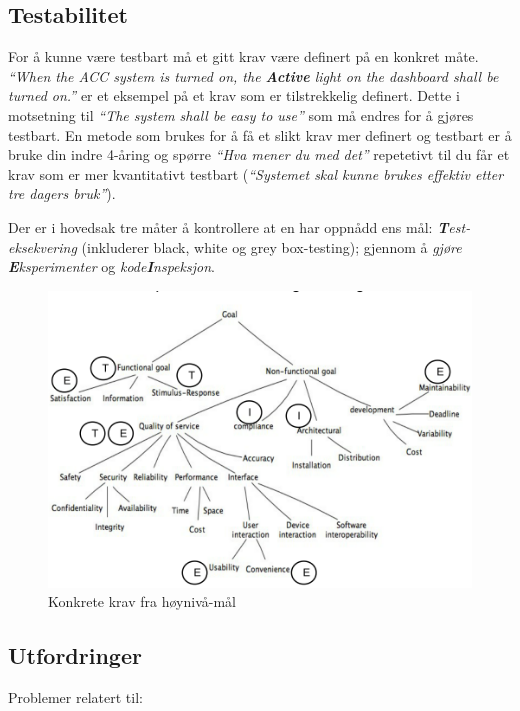 \subsection{Testabilitet}

For å kunne være testbart må et gitt krav være definert på en konkret
måte. \emph{``When the ACC system is turned on, the \textbf{Active}
light on the dashboard shall be turned on.''} er et eksempel på et krav
som er tilstrekkelig definert. Dette i motsetning til \emph{``The system
shall be easy to use''} som må endres for å gjøres testbart. En metode
som brukes for å få et slikt krav mer definert og testbart er å bruke
din indre 4-åring og spørre \emph{``Hva mener du med det''} repetetivt
til du får et krav som er mer kvantitativt testbart (\emph{``Systemet
skal kunne brukes effektiv etter tre dagers bruk''}).

Der er i hovedsak tre måter å kontrollere at en har oppnådd ens mål:
\emph{\textbf{T}est-eksekvering} (inkluderer black, white og grey
box-testing); gjennom å \emph{gjøre \textbf{E}ksperimenter} og
\emph{kode\textbf{I}nspeksjon}.

\begin{figure}[htbp]
\centering
\includegraphics{Forelesning 03/img/1.png}
\caption{Konkrete krav fra høynivå-mål}
\end{figure}

\subsection{Utfordringer}

Problemer relatert til:

